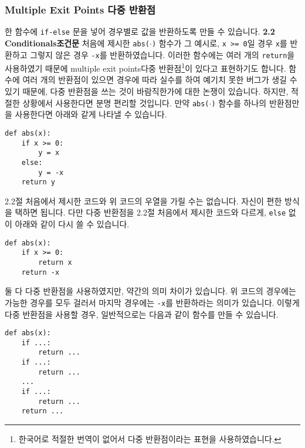 \documentclass[../main.tex]{subfiles}
\begin{document}
\subsubsection{Multiple Exit Points 다중 반환점}
한 함수에 \texttt{if-else} 문을 넣어 경우별로 값을 반환하도록 만들 수 있습니다.
\textbf{2.2 Conditionals조건문} 처음에 제시한 \texttt{abs($\cdot$)} 함수가 그 예시로, \texttt{x >= 0}일 경우 \texttt{x}를 반환하고 그렇지 않은 경우 \texttt{-x}를 반환하였습니다.
이러한 함수에는 여러 개의 \texttt{return}을 사용하였기 때문에 multiple exit points다중 반환점\footnote{한국어로 적절한 번역이 없어서 다중 반환점이라는 표현을 사용하였습니다.}이 있다고 표현하기도 합니다.
함수에 여러 개의 반환점이 있으면 경우에 따라 실수를 하여 예기치 못한 버그가 생길 수 있기 때문에, 다중 반환점을 쓰는 것이 바람직한가에 대한 논쟁이 있습니다.
하지만, 적절한 상황에서 사용한다면 분명 편리할 것입니다.
만약  \texttt{abs($\cdot$)} 함수를 하나의 반환점만을 사용한다면 아래와 같게 나타낼 수 있습니다.
\begin{verbatim}
def abs(x):
	if x >= 0:
		y = x
	else:
		y = -x
	return y
\end{verbatim}
2.2절 처음에서 제시한 코드와 위 코드의 우열을 가릴 수는 없습니다.
자신이 편한 방식을 택하면 됩니다.
다만 다중 반환점을 2.2절 처음에서 제시한 코드와 다르게, \texttt{else} 없이 아래와 같이 다시 쓸 수 있습니다.
\begin{verbatim}
def abs(x):
	if x >= 0:
		return x
	return -x
\end{verbatim}
둘 다 다중 반환점을 사용하였지만, 약간의 의미 차이가 있습니다.
위 코드의 경우에는 가능한 경우를 모두 걸러서 마지막 경우에는 \texttt{-x}를 반환하라는 의미가 있습니다.
이렇게 다중 반환점을 사용할 경우, 일반적으로는 다음과 같이 함수를 만들 수 있습니다.
\begin{verbatim}
def abs(x):
	if ...:
		return ...
	if ...:
		return ...
	...
	if ...:
		return ...
	return ...
\end{verbatim}
\end{document}

